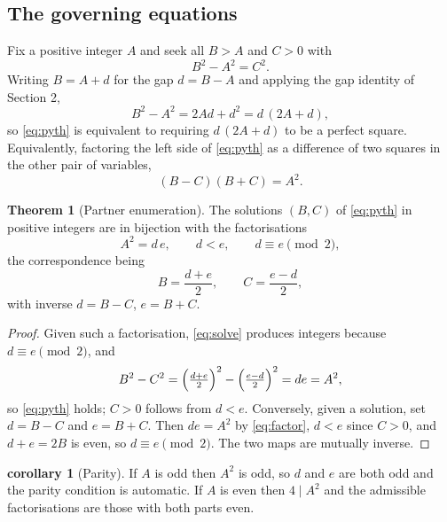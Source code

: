 \documentclass[11pt]{article}
\theoremstyle{definition}
\newtheorem{theorem}{Theorem}
\newtheorem{corollary}{corollary}
\begin{document}
\subsection{The governing equations}

Fix a positive integer $A$ and seek all $B > A$ and $C > 0$ with
\begin{equation}\label{eq:pyth}
  B^2 - A^2 = C^2 .
\end{equation}
Writing $B = A + d$ for the gap $d = B - A$ and applying the gap identity of
Section 2,
\begin{equation}\label{eq:gap}
  B^2 - A^2 = 2Ad + d^2 = d\,(2A+d),
\end{equation}
so \eqref{eq:pyth} is equivalent to requiring $d\,(2A+d)$ to be a perfect
square. Equivalently, factoring the left side of \eqref{eq:pyth} as a
difference of two squares in the other pair of variables,
\begin{equation}\label{eq:factor}
  (B-C)(B+C) = A^2 .
\end{equation}

\begin{theorem}[Partner enumeration]\label{thm:partners}
The solutions $(B,C)$ of \eqref{eq:pyth} in positive integers are in bijection
with the factorisations
\[
  A^2 = d\,e, \qquad d < e, \qquad d \equiv e \pmod 2,
\]
the correspondence being
\begin{equation}\label{eq:solve}
  B = \frac{d+e}{2}, \qquad C = \frac{e-d}{2},
\end{equation}
with inverse $d = B-C$, $e = B+C$.
\end{theorem}

\begin{proof}
Given such a factorisation, \eqref{eq:solve} produces integers because
$d \equiv e \pmod 2$, and
\[
  B^2 - C^2 = \Bigl(\tfrac{d+e}{2}\Bigr)^{2} - \Bigl(\tfrac{e-d}{2}\Bigr)^{2}
            = de = A^2 ,
\]
so \eqref{eq:pyth} holds; $C>0$ follows from $d<e$. Conversely, given a
solution, set $d = B-C$ and $e = B+C$. Then $de = A^2$ by \eqref{eq:factor},
$d<e$ since $C>0$, and $d+e = 2B$ is even, so $d \equiv e \pmod 2$. The two
maps are mutually inverse.
\end{proof}

\begin{corollary}[Parity]
If $A$ is odd then $A^2$ is odd, so $d$ and $e$ are both odd and the parity
condition is automatic. If $A$ is even then $4 \mid A^2$ and the admissible
factorisations are those with both parts even.
\end{corollary}
\end{document}
